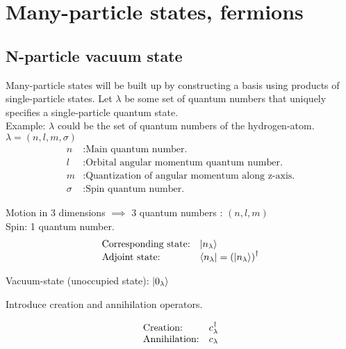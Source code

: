 
%

\section{Many-particle states, fermions}

\subsection{N-particle vacuum state}



Many-particle states will be built up by constructing a basis using products of single-particle states. 
Let $\lambda$ be some set of quantum numbers that uniquely specifies a single-particle quantum state.\\

\noindent Example: $\lambda$ could be the set of quantum numbers of the hydrogen-atom.\\
$\lambda = (n,l,m, \sigma)$\\
\begin{align*}
	n &: \text{Main quantum number.}\\
	l &: \text{Orbital angular momentum quantum number.}\\
	m &: \text{Quantization of angular momentum along z-axis.}\\ 
	\sigma &: \text{Spin quantum number.}
\end{align*}

\noindent Motion in 3 dimensions $\implies$ 3 quantum numbers : $(n,l,m)$\\
Spin: 1 quantum number.\\

\[ \begin{array}{ll}
\mbox{Corresponding state:} & \ket{n_\lambda}\\
\mbox{Adjoint state:} &  \bra{n_\lambda} = \left(\ket{n_\lambda} \right)^\dagger
\end{array}\] 



\noindent Vacuum-state (unoccupied state): $\ket{0_\lambda}$

\noindent Introduce creation and annihilation operators.

\[ \begin{array}{ll}
\mbox{Creation:} & c^{\dagger}_\lambda\\
\mbox{Annihilation:} & c_\lambda
\end{array}\] 

